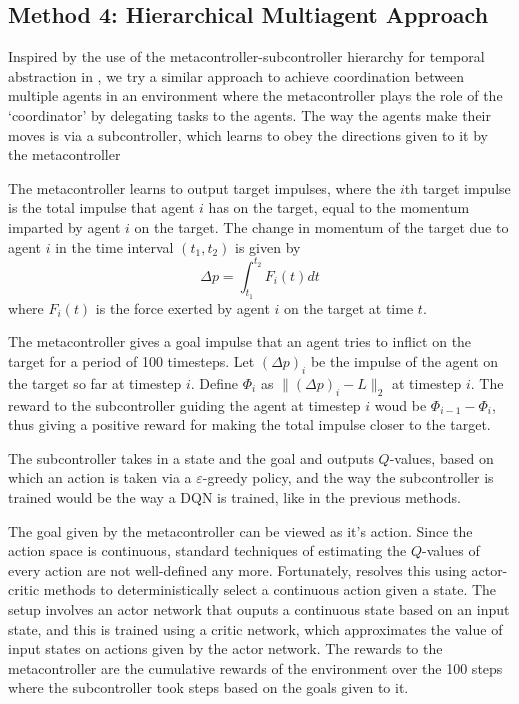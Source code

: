 \documentclass{article}
\begin{document}
\subsection{Method 4: Hierarchical Multiagent Approach}
Inspired by the use of the metacontroller-subcontroller
hierarchy for temporal abstraction in \cite{kulkarni2016hierarchical}, we try a similar approach
to achieve coordination between multiple agents in an
environment where the metacontroller plays the role of the `coordinator' by delegating
tasks to the agents. The way the agents make their moves is via a subcontroller,
which learns to obey the directions given to it by the metacontroller

The metacontroller learns to output target
impulses, where the $i$th target impulse is the total impulse
that agent $i$ has on the target, equal to the momentum
imparted by agent $i$ on the target. The change in momentum of the target due to
agent $i$ in the time interval $(t_1,t_2)$ is given by
\[
\Delta p = \int_{t_1}^{t_2} F_i(t)dt
\]
where $F_i(t)$ is the force exerted by agent $i$ on the target at time $t$.

The metacontroller gives a goal impulse that an agent tries to inflict on the target
for a period of 100 timesteps. Let $(\Delta p)_i$ be the impulse of the agent
on the target so far at timestep $i$. Define $\Phi_i$ as $\|(\Delta p)_i - L\|_2$ at timestep $i$.
The reward to the subcontroller guiding the agent at timestep $i$ woud be
$\Phi_{i-1}-\Phi_i$, thus giving a positive reward for making the total impulse
closer to the target.

The subcontroller takes in a state and the goal and outputs $Q$-values, based on which
an action is taken via a $\varepsilon$-greedy policy, and the way the subcontroller is
trained would be the way a DQN is trained, like in the previous methods.

The goal given by the metacontroller can be viewed as it's action. Since the action
space is continuous, standard techniques of estimating the $Q$-values of every action
are not well-defined any more. Fortunately, \cite{lillicrap2015continuous} resolves
this using actor-critic methods to deterministically select a continuous action
given a state. The setup involves an actor network that ouputs a continuous state based
on an input state, and this is trained using a critic network, which approximates the
value of input states on actions given by the actor network. The rewards to the metacontroller
are the cumulative rewards of the environment over the 100 steps where the subcontroller
took steps based on the goals given to it.
\end{document}

